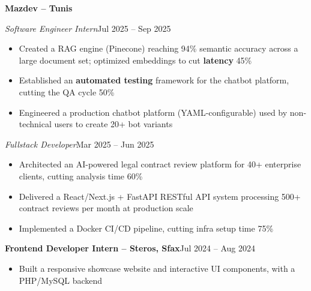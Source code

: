 \documentclass[10pt,a4paper]{article}
\newcommand{\entry}[2]{\vspace{1pt}\noindent\textbf{#1}\hfill{\color{muted}#2}\par}
\newcommand{\subentry}[2]{\noindent\textit{#1}\hfill{\color{muted}#2}\par}
\begin{document}
\entry{Mazdev -- Tunis}{}
\subentry{Software Engineer Intern}{Jul 2025 -- Sep 2025}
\begin{itemize}
  \item Created a RAG engine (Pinecone) reaching 94\% semantic accuracy across a large document set; optimized embeddings to cut \textbf{latency} 45\%
  \item Established an \textbf{automated testing} framework for the chatbot platform, cutting the QA cycle 50\%
  \item Engineered a production chatbot platform (YAML-configurable) used by non-technical users to create 20+ bot variants
\end{itemize}
\subentry{Fullstack Developer}{Mar 2025 -- Jun 2025}
\begin{itemize}
  \item Architected an AI-powered legal contract review platform for 40+ enterprise clients, cutting analysis time 60\%
  \item Delivered a React/Next.js + FastAPI RESTful API system processing 500+ contract reviews per month at production scale
  \item Implemented a Docker CI/CD pipeline, cutting infra setup time 75\%
\end{itemize}

\entry{Frontend Developer Intern -- Steros, Sfax}{Jul 2024 -- Aug 2024}
\begin{itemize}
  \item Built a responsive showcase website and interactive UI components, with a PHP/MySQL backend
\end{itemize}
\end{document}
